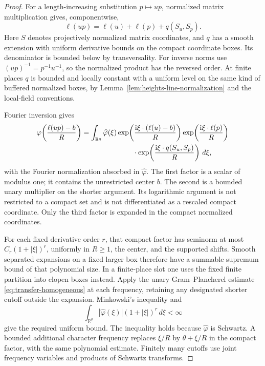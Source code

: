 \begin{proof}
For a length-increasing substitution $p\mapsto up$, normalized matrix
multiplication gives, componentwise,
\[
 \ell(up)=\ell(u)+\ell(p)+q(S_u,S_p).
\]
Here $S$ denotes projectively normalized matrix coordinates, and $q$ has a
smooth extension with uniform derivative bounds on the compact coordinate
boxes.  Its denominator is bounded below by transversality.  For inverse
norms use $(up)^{-1}=p^{-1}u^{-1}$, so the normalized product has the
reversed order.  At finite places $q$ is bounded and locally constant with
a uniform level on the same kind of buffered normalized boxes, by
Lemma~\ref{lem:heights-line-normalization} and the local-field conventions.

Fourier inversion gives
\begin{align*}
 \varphi\!\left(\frac{\ell(up)-b}{R}\right)
 =\int_{\mathbb R^q}\widehat\varphi(\xi)
 &\exp\!\left(\frac{\mathrm i\xi\cdot(\ell(u)-b)}{R}\right)
 \exp\!\left(\frac{\mathrm i\xi\cdot\ell(p)}{R}\right)\\
 &\hspace{8mm}\cdot
 \exp\!\left(\frac{\mathrm i\xi\cdot q(S_u,S_p)}{R}\right)\,d\xi,
\end{align*}
with the Fourier normalization absorbed in $\widehat\varphi$.
The first factor is a scalar of modulus one; it contains the unrestricted
center $b$.  The second is a bounded unary multiplier on the shorter
argument.  Its logarithmic argument is not restricted to a compact set and
is not differentiated as a rescaled compact coordinate.  Only the third
factor is expanded in the compact normalized coordinates.

For each fixed derivative order $r$, that compact factor has seminorm at
most $C_r(1+|\xi|)^r$, uniformly in $R\geq1$, the center, and the supported
shifts.  Smooth separated expansions on a fixed larger box therefore have
a summable supremum bound of that polynomial size.  In a finite-place slot
one uses the fixed finite partition into clopen boxes instead.  Apply the
unary Gram--Plancherel estimate \eqref{eq:transfer-homogeneous} at each
frequency, retaining any designated shorter cutoff outside the expansion.
Minkowski's inequality and
\[
 \int_{\mathbb R^q}|\widehat\varphi(\xi)|(1+|\xi|)^r\,d\xi<\infty
\]
give the required uniform bound.  The inequality holds because
$\widehat\varphi$ is Schwartz.  A bounded additional character frequency
replaces $\xi/R$ by $\theta+\xi/R$ in the compact factor, with the same
polynomial estimate.  Finitely many cutoffs use joint frequency variables
and products of Schwartz transforms.


\end{proof}
